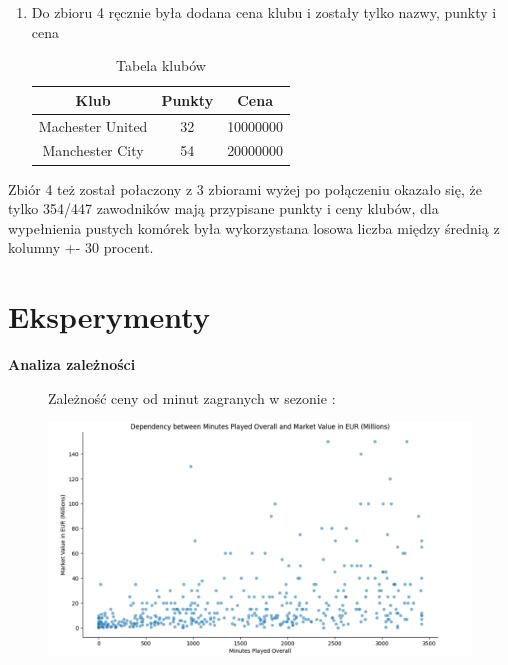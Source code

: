 \documentclass{article}
\begin{document}
\begin{enumerate}
    \item Do zbioru 4 ręcznie była dodana cena klubu i zostały tylko nazwy, punkty i cena

    \begin{table}[H]
        \centering
        \caption{Tabela klubów}
        \label{tab:vehicle_data_1}
        \begin{tabular}{ccc}
        \toprule
        Klub & Punkty & Cena \\
        \midrule
        Machester United & 32 & 10000000\\
        Manchester City & 54 & 20000000\\
        \bottomrule
        \end{tabular}
    \end{table}
 
\end{enumerate}

Zbiór 4 też został połaczony z 3 zbiorami wyżej po połączeniu okazało się, że tylko 354/447 zawodników mają przypisane punkty i ceny klubów, dla wypełnienia pustych komórek była wykorzystana losowa liczba między średnią z kolumny +- 30 procent.




\section{Eksperymenty}

\textbf{Analiza zależności}


\begin{figure}[H]
    \centering
        \begin{minipage}{0.5\textwidth} 
        \centering Zależność ceny od minut zagranych w sezonie :
    \end{minipage}
    \begin{minipage}{1\textwidth} 
        \includegraphics[width=\linewidth]{minutes.png} 
        \label{fig:zdjecie}
    \end{minipage}
    \hfill 

\end{figure}
\end{document}
